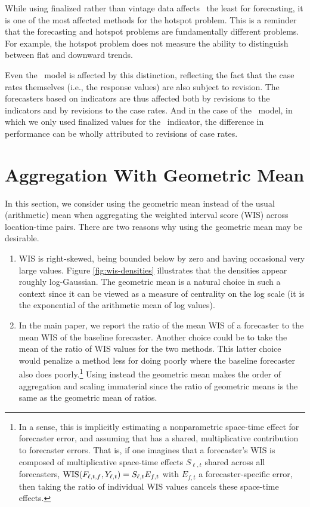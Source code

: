 While using finalized rather than vintage data affects \dv~the least for
forecasting, it is one of the most affected methods for the hotspot problem.
This is a reminder that the forecasting and hotspot problems are fundamentally
different problems.  For example, the hotspot problem does not measure the
ability to distinguish between flat and downward trends.

Even the \ar~model is affected by this distinction, reflecting the fact that the
case rates themselves (i.e., the response values) are also subject to revision.
The forecasters based on indicators are thus affected both by revisions to the
indicators and by revisions to the case rates.  And in the case of the
\gs~model, in which we only used finalized values for the \gs~indicator, the
difference in performance can be wholly attributed to revisions of case rates. 

\section{Aggregation With Geometric Mean}

In this section, we consider using the geometric mean instead of the usual
(arithmetic) mean when aggregating the weighted interval score (WIS) across
location-time pairs.  There are two reasons why using the geometric mean may be
desirable.

\begin{enumerate}
\item WIS is right-skewed, being bounded below by zero and having occasional 
  very large values.  Figure \ref{fig:wis-densities} illustrates that the
  densities appear roughly log-Gaussian.  The geometric mean is a natural choice   
  in such a context since it can be viewed as a measure of centrality on the log
  scale (it is the exponential of the arithmetic mean of log values).
\item In the main paper, we report the ratio of the mean WIS of a forecaster to
  the mean WIS of the baseline forecaster. Another choice could be to take the
  mean of the ratio of WIS values for the two methods. This latter choice would
  penalize a method less for doing poorly where the baseline forecaster also
  does poorly.\footnote{In a sense, this is implicitly estimating a
    nonparametric space-time effect for forecaster error, and assuming that has
    a shared, multiplicative contribution to forecaster errors.  That is, if one
    imagines that a forecaster's WIS is composed of multiplicative space-time
    effects $S_{\ell,t}$ shared across all forecasters,
    $\mathrm{WIS}(F_{\ell,t,f},Y_{\ell,t}) = S_{\ell,t} E_{f,t}$ with $E_{f,t}$ a 
    forecaster-specific error, then taking the ratio of individual WIS values
    cancels these space-time effects.}  Using instead the geometric
  mean makes the order of aggregation and scaling immaterial since the ratio of
  geometric means is the same as the geometric mean of ratios.
\end{enumerate}

